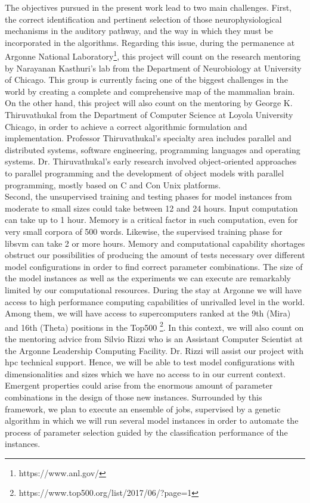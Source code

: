 \documentclass[11pt,a4paper]{article}
\newcommand{\CC}{C\nolinebreak\hspace{-.05em}\raisebox{.4ex}{\tiny\bf +}\nolinebreak\hspace{-.10em}\raisebox{.4ex}{\tiny\bf +}}
\begin{document}
The objectives pursued in the present work lead to two main challenges.
First, the correct identification and pertinent selection of those neurophysiological
mechanisms in the auditory pathway, and the way in which they must be incorporated
in the algorithms.
Regarding this issue, during the permanence at Argonne National Laboratory\footnote{https://www.anl.gov/},
this project will count on the
research mentoring by Narayanan Kasthuri's lab
from the Department of Neurobiology at University of Chicago.
This group is currently facing one of the biggest challenges in the world by 
creating a complete and comprehensive map of the mammalian brain.
On the other hand, this project will also count on the mentoring by
George K. Thiruvathukal from the Department of Computer Science at
Loyola University Chicago,
in order to achieve a correct algorithmic formulation and implementation.
Professor Thiruvathukal's specialty area includes
parallel and distributed systems, software engineering, programming languages and operating systems.
Dr. Thiruvathukal's early research involved object-oriented approaches to parallel programming
and the development of object models with parallel programming, mostly based on C and \CC  on Unix platforms. \\

Second, the
unsupervised training and testing phases for model instances from moderate to small sizes
could take between 12 and 24 hours.
Input computation can take up to 1 hour.
Memory is a critical factor in such computation,
even for very small corpora of 500 words.
Likewise, the supervised training phase for \gls{libsvm} can take 2 or more hours.
Memory and computational capability shortages obstruct our possibilities of producing
the amount of tests necessary over different model configurations in order to find correct
parameter combinations.
The size of the model instances as well as the experiments we can execute
are remarkably limited by our computational resources.
During the stay at Argonne we will have access
to high performance computing capabilities of unrivalled level in the world.
Among them, we will have access to supercomputers
ranked at the 9th (Mira) and 16th (Theta) positions in the Top500
\footnote{https://www.top500.org/list/2017/06/?page=1}.
In this context, we will also count on the mentoring advice from Silvio Rizzi
who is an Assistant Computer Scientist at the Argonne Leadership Computing Facility.
Dr. Rizzi will assist our project with \gls{hpc} technical support.
Hence, we will be able to test model configurations
with dimensionalities and sizes which we have no access to in our current context.
Emergent properties could arise from the enormous amount of parameter combinations in the design
of those new instances.
Surrounded by this framework, we plan to execute an ensemble of jobs,
supervised by a genetic algorithm in which we will run several model instances
in order to automate the process of parameter selection guided by the
classification performance of the instances. \\
\end{document}
